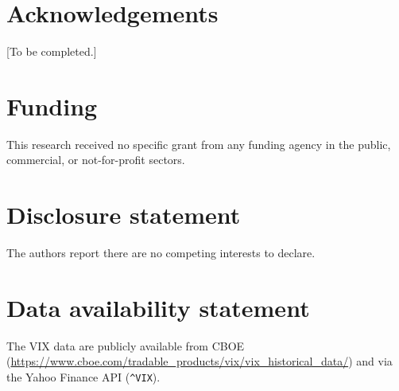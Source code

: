 \documentclass[12pt,a4paper]{article}
\begin{document}
\section*{Acknowledgements}
[To be completed.]

\section*{Funding}
This research received no specific grant from any funding agency in the
public, commercial, or not-for-profit sectors.

\section*{Disclosure statement}
The authors report there are no competing interests to declare.

\section*{Data availability statement}
The VIX data are publicly available from CBOE
(\url{https://www.cboe.com/tradable_products/vix/vix_historical_data/})
and via the Yahoo Finance API (\texttt{\^{}VIX}).


\end{document}
